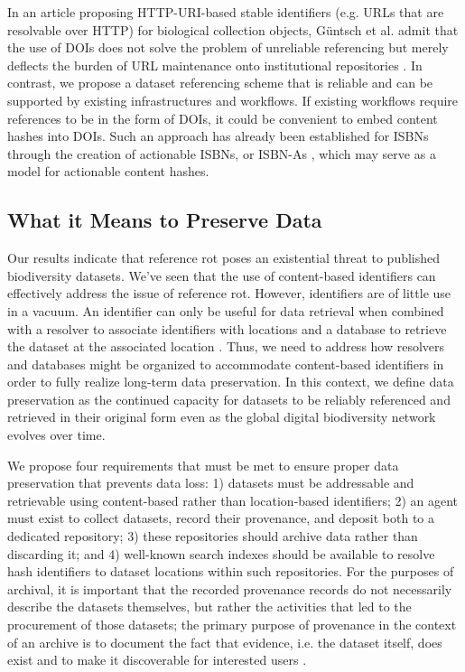 In an article proposing HTTP-URI-based stable identifiers (e.g. URLs that are resolvable over HTTP) for biological collection objects, Güntsch et al. admit that the use of DOIs does not solve the problem of unreliable referencing but merely deflects the burden of URL maintenance onto institutional repositories \citep{G_ntsch_2017}. In contrast, we propose a dataset referencing scheme that is reliable and can be supported by existing infrastructures and workflows. If existing workflows require references to be in the form of DOIs, it could be convenient to embed content hashes into DOIs. Such an approach has already been established for ISBNs through the creation of actionable ISBNs, or ISBN-As \citep{Weissberg_2008}, which may serve as a model for actionable content hashes. 

\subsection*{What it Means to Preserve Data} 

Our results indicate that reference rot poses an existential threat to published biodiversity datasets. We’ve seen that the use of content-based identifiers can effectively address the issue of reference rot. However, identifiers are of little use in a vacuum. An identifier can only be useful for data retrieval when combined with a resolver to associate identifiers with locations and a database to retrieve the dataset at the associated location \citep{Paskin_1999}. Thus, we need to address how resolvers and databases might be organized to accommodate content-based identifiers in order to fully realize long-term data preservation. In this context, we define data preservation as the continued capacity for datasets to be reliably referenced and retrieved in their original form even as the global digital biodiversity network evolves over time. 

We propose four requirements that must be met to ensure proper data preservation that prevents data loss: 1) datasets must be addressable and retrievable using content-based rather than location-based identifiers; 2) an agent must exist to collect datasets, record their provenance, and deposit both to a dedicated repository; 3) these repositories should archive data rather than discarding it; and 4) well-known search indexes should be available to resolve hash identifiers to dataset locations within such repositories. For the purposes of archival, it is important that the recorded provenance records do not necessarily describe the datasets themselves, but rather the activities that led to the procurement of those datasets; the primary purpose of provenance in the context of an archive is to document the fact that evidence, i.e. the dataset itself, does exist and to make it discoverable for interested users \citep{Bearman_1995}. 


